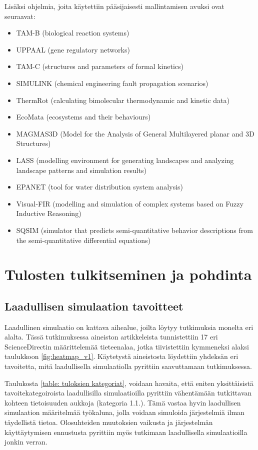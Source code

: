 \documentclass[utf8]{gradu3}
\begin{document}
Lisäksi ohjelmia, joita käytettiin pääsijaisesti mallintamisen avuksi ovat seuraavat:
\begin{itemize}
    \item TAM-B (biological reaction systems)
    \item UPPAAL (gene regulatory networks)
    \item TAM-C (structures and parameters of formal kinetics)
    \item SIMULINK (chemical engineering fault propagation scenarios)
    \item ThermRot (calculating bimolecular thermodynamic and kinetic data)
    \item EcoMata (ecosystems and their behaviours)
    \item MAGMAS3D (Model for the Analysis of General Multilayered planar and 3D Structures)
    \item LASS (modelling environment for generating landscapes and analyzing landscape patterns and simulation results)
    \item EPANET (tool for water distribution system analysis)
    \item Visual-FIR (modelling and simulation of complex systems based on Fuzzy Inductive Reasoning)
    \item SQSIM (simulator that predicts semi-quantitative behavior descriptions from the  semi-quantitative differential equations)
\end{itemize}

\chapter{Tulosten tulkitseminen ja pohdinta} \label{tulkitseminen ja pohdinta}

\section{Laadullisen simulaation tavoitteet}
Laadullinen simulaatio on kattava aihealue, joilta löytyy tutkimuksia monelta eri alalta.
Tässä tutkimuksessa aineiston artikkeleista tunnistettiin 17 
eri ScienceDirectin määrittelemää tieteenalaa, 
jotka tiivistettiin kymmeneksi alaksi taulukkoon 
\ref{fig:heatmap_v1}.
Käytetystä aineistosta löydettiin yhdeksän eri tavoitetta, 
mitä laadullisella simulaatiolla pyrittiin saavuttamaan tutkimuksessa.

Taulukosta \ref{table: tuloksien kategoriat}, voidaan havaita, 
että eniten yksittäisistä tavoitekategoiroista 
laadullisilla simulaatioilla pyrittiin vähentämään tutkittavan 
kohteen tietoisuuden aukkoja (kategoria 1.1.). 
Tämä vastaa hyvin laadullisen simulaation määritelmää
työkaluna, jolla voidaan simuloida järjestelmiä ilman täydellistä tietoa.
Olosuhteiden muutoksien vaikusta ja järjestelmän käyttäytymisen ennustusta
pyrittiin myös tutkimaan laadullisella simulaatioilla jonkin verran.
\end{document}
